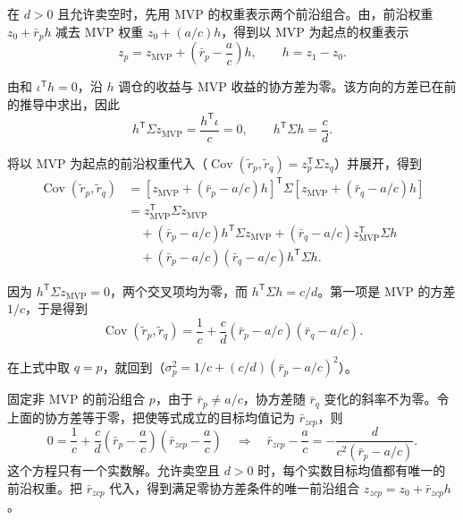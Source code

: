 \begin{solution}[label-content={},label-indentation=false,blank-type=none,show-qed=false,label-punct={}]
\begin{tcolorbox}[knowledge,title={\WJRef{thm:wj-twelve-9}{定理~} 的另一种证明（从 MVP 出发）}]
在 $d>0$ 且允许卖空时，先用 MVP 的权重表示两个前沿组合。由，前沿权重 $z_0+\bar r_p h$ 减去 MVP 权重 $z_0+(a/c)h$，得到以 MVP 为起点的权重表示
\[
 z_p=z_{\mathrm{MVP}}+\left(\bar r_p-\frac ac\right)h,\qquad h=z_1-z_0.
\]

由和 $\iota^{\mathsf T}h=0$，沿 $h$ 调仓的收益与 MVP 收益的协方差为零。该方向的方差已在前的推导中求出，因此
\[
 h^{\mathsf T}\Sigma z_{\mathrm{MVP}}=\frac{h^{\mathsf T}\iota}{c}=0,
 \qquad
 h^{\mathsf T}\Sigma h=\frac cd.
\]

将以 MVP 为起点的前沿权重代入（$\operatorname{Cov}(\widetilde r_p,\widetilde r_q)=z_p^{\mathsf T}\Sigma z_q$）并展开，得到
\[
 \begin{aligned}
 \operatorname{Cov}(\widetilde r_p,\widetilde r_q)
 &=\left[z_{\mathrm{MVP}}+(\bar r_p-a/c)h\right]^{\mathsf T}
      \Sigma\left[z_{\mathrm{MVP}}+(\bar r_q-a/c)h\right]\\
 &=z_{\mathrm{MVP}}^{\mathsf T}\Sigma z_{\mathrm{MVP}}\\
 &\quad+(\bar r_p-a/c)h^{\mathsf T}\Sigma z_{\mathrm{MVP}}
   +(\bar r_q-a/c)z_{\mathrm{MVP}}^{\mathsf T}\Sigma h\\
 &\quad+(\bar r_p-a/c)(\bar r_q-a/c)h^{\mathsf T}\Sigma h.
 \end{aligned}
\]

因为 $h^{\mathsf T}\Sigma z_{\mathrm{MVP}}=0$，两个交叉项均为零，而 $h^{\mathsf T}\Sigma h=c/d$。第一项是 MVP 的方差 $1/c$，于是得到
\[
 \operatorname{Cov}(\widetilde r_p,\widetilde r_q)
 =\frac1c+\frac cd(\bar r_p-a/c)(\bar r_q-a/c).
\]

在上式中取 $q=p$，就回到（$\sigma_p^2=1/c+(c/d)(\bar r_p-a/c)^2$）。

固定非 MVP 的前沿组合 $p$，由于 $\bar r_p\ne a/c$，协方差随 $\bar r_q$ 变化的斜率不为零。令上面的协方差等于零，把使等式成立的目标均值记为 $\bar r_{zcp}$，则
\[
 0=\frac1c+\frac cd\left(\bar r_p-\frac ac\right)
                 \left(\bar r_{zcp}-\frac ac\right)
 \quad\Longrightarrow\quad
 \bar r_{zcp}-\frac ac=-\frac{d}{c^2(\bar r_p-a/c)}.
\]
这个方程只有一个实数解。允许卖空且 $d>0$ 时，每个实数目标均值都有唯一的前沿权重。把 $\bar r_{zcp}$ 代入，得到满足零协方差条件的唯一前沿组合 $z_{zcp}=z_0+\bar r_{zcp}h$。
\end{tcolorbox}
\end{solution}

